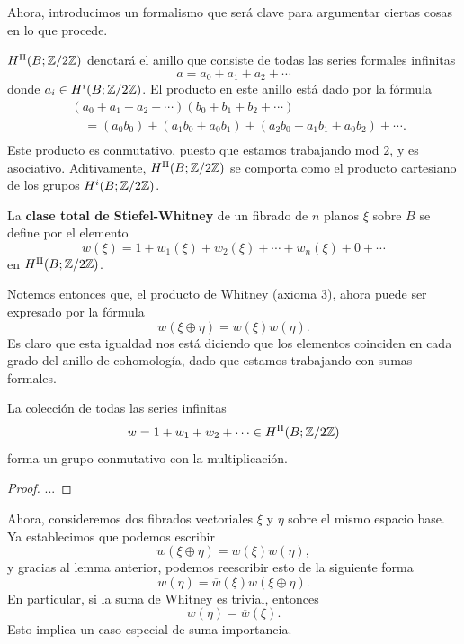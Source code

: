 Ahora, introducimos un formalismo que será clave para argumentar ciertas cosas en lo que procede.

\begin{definition}
	$H^{\Pi}(B; \mathbb{Z} \slash 2\mathbb{Z})$ denotará el anillo que consiste de todas las series formales infinitas
	\[ a = a_{0} + a_{1} + a_{2} + \cdots \]
	donde $a_{i} \in H^{i}(B; \mathbb{Z} \slash 2\mathbb{Z})$. El producto en este anillo está dado por la fórmula
	\begin{align*}
		& (a_{0} + a_{1} + a_{2} + \cdots)(b_{0} + b_{1} + b_{2} + \cdots) \\
		& \quad = (a_{0}b_{0}) + (a_{1}b_{0} + a_{0}b_{1}) + (a_{2}b_{0} + a_{1}b_{1} + a_{0}b_{2}) + \cdots. \\
	\end{align*}
	Este producto es conmutativo, puesto que estamos trabajando mod $2$, y es asociativo. Aditivamente, $H^{\Pi}(B; \mathbb{Z} \slash 2\mathbb{Z})$ se comporta como el producto cartesiano de los grupos $H^{i}(B; \mathbb{Z} \slash 2\mathbb{Z})$.
\end{definition}

\begin{definition}
	La \textbf{clase total de Stiefel-Whitney} de un fibrado de $n$ planos $\xi$ sobre $B$ se define por el elemento 
	\[ w(\xi) = 1 + w_{1}(\xi) + w_{2}(\xi) + \cdots + w_{n}(\xi) + 0 + \cdots \]
	en $H^{\Pi}(B; \mathbb{Z} \slash 2\mathbb{Z})$.
\end{definition}

Notemos entonces que, el producto de Whitney (axioma 3), ahora puede ser expresado por la fórmula
\[ w(\xi \oplus \eta) = w(\xi) w(\eta). \]
Es claro que esta igualdad nos está diciendo que los elementos coinciden en cada grado del anillo de cohomología, dado que estamos trabajando con sumas formales.

\begin{lemma}
	La colección de todas las series infinitas
	\[ w = 1 + w_{1} + w_{2} + \cdots \in H^{\Pi}(B; \mathbb{Z} \slash 2\mathbb{Z}) \]
	forma un grupo conmutativo con la multiplicación.
\end{lemma}
\begin{proof}
	...
\end{proof}

Ahora, consideremos dos fibrados vectoriales $\xi$ y $\eta$ sobre el mismo espacio base. Ya establecimos que podemos escribir
\[ w(\xi \oplus \eta) = w(\xi)w(\eta), \]
y gracias al lemma anterior, podemos reescribir esto de la siguiente forma
\[ w(\eta) = \overline{w}(\xi) w(\xi \oplus \eta). \]
En particular, si la suma de Whitney es trivial, entonces
\[ w(\eta) = \overline{w}(\xi). \]
Esto implica un caso especial de suma importancia.

